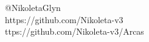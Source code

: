 \documentclass{beamer}
\begin{document}
%
%
%		
%
%
%
%
%
%
%

\begin{frame}
	\begin{center}
		\huge{\textbf{}}\\~\\
		\small{@NikoletaGlyn}\\
		\small{https://github.com/Nikoleta-v3}\\
		\small{ttps://github.com/Nikoleta-v3/Arcas}
	\end{center}
\end{frame}
\end{document}
